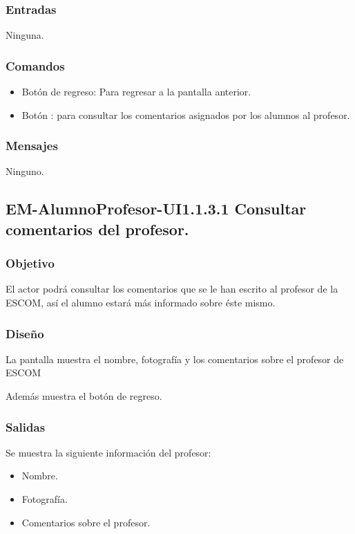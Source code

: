 \subsubsection{Entradas}
	\noindent
	Ninguna.

\subsubsection{Comandos}
	\begin{itemize}
		\item Botón de regreso: Para regresar a la pantalla anterior.
		\item Botón  : para consultar los comentarios asignados por los alumnos al profesor.
	\end{itemize}

\subsubsection{Mensajes}
	\noindent
	Ninguno.

\subsection{EM-AlumnoProfesor-UI1.1.3.1 Consultar comentarios del profesor.}

\subsubsection{Objetivo}
	\noindent
	El actor podrá consultar los comentarios que se le han escrito al profesor de la ESCOM, así el alumno estará más informado sobre éste mismo.
\subsubsection{Diseño}
	\noindent
	La pantalla muestra el nombre, fotografía y los comentarios sobre el profesor de ESCOM
	
	Además muestra el botón de regreso.



\subsubsection{Salidas}
	\noindent
	Se muestra la siguiente información del profesor:
	\begin{itemize} 
		\item Nombre.
		\item Fotografía.
		\item Comentarios sobre el profesor.
	\end{itemize}


